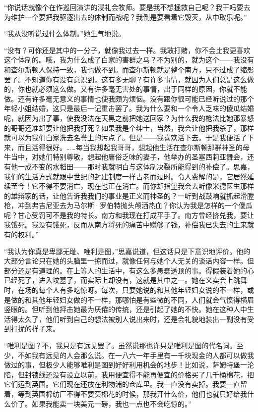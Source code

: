 \par “你说话就像个在作巡回演讲的浸礼会牧师。要是我不想拯救自己呢？我干吗要去为维护一个要把我驱逐出去的体制而战呢？我倒是要看着它毁灭，从中取乐呢。”
\par “我从没听说过什么体制。”她生气地说。
\par “没有？可你还是其中的一分子，就像我过去一样。我敢打赌，你不会比我更喜欢这个体制的。哦，我为什么成了白家的害群之马？不为别的，就为这个——我没有和查尔斯顿人保持一致，我也做不到。而查尔斯顿就是整个南方，只不过成了缩影罢了。不知道你有没有意识到，这有多无聊？有许多事情，就因为人们总是这么做的，你也就必须这么做。又有许多毫无害处的事情，出于同样的原因，你就不能做。还有许多毫无意义的事情也使我颇为烦恼。没有跟你很可能已经听说过的那个年轻小姐结婚，这只是最后一记重击罢了。我为什么要和一个令人乏味的傻瓜结婚呢，就因为出了事，使我没法在天黑之前把她送回家？为什么我的枪法比她那暴怒的哥哥还准却要让他把我打死？如果我是个绅士，当然，我会让他把我杀了，那样就可以为我们白家洗去名誉上的污点了。但是——我喜欢活下去。于是我便活了下来，而且活得很好。……每当我想起我哥哥，想起他生活在查尔斯顿那群神圣的母牛当中，对她们特别尊敬，想起他庸俗乏味的妻子，他举办的圣塞西莉亚舞会，还有他一成不变的水稻田——那时我就明白与这体制决裂所能得到的补偿了。思嘉，我们的生活方式就跟中世纪的封建制度一样古老而过时。令人费解的是，它居然延续至今！它不得不要消亡，现在也正在消亡。而你却指望我会去听像米德医生那样的雄辩家的话，让他告诉我我们的事业是正义而神圣的？一听到战鼓响就抓起滑膛枪，冲到弗吉尼亚去为马尔斯·罗伯特抛头颅洒热血？你认为我是怎样的一个傻瓜呢？甘心受罚可不是我的特长。南方和我现在打成平手了。南方曾经挤兑我，要让我饿死。我没有饿死，反而从南方将死的痛苦中赚够了钱，补偿我已失去的生来就有的权利。”
\par “我认为你真是卑鄙无耻、唯利是图，”思嘉说道，但这话只是下意识地评价。他的大部分言论只在她的头脑里一掠而过，就像任何与她个人无关的谈话内容一样。但部分还是有道理的。在上等人的生活中，有这么多愚蠢透顶的事。得假装着她的心已经死了，进入坟墓了，而实际上却没有，这就是其中之一。她在义卖会上跳舞时，在场的每个人有多吃惊呀。每次，只要她说的和其他年轻妇女说的不一样，或是做的和其他年轻妇女做的不一样，那哪怕是有些微的不同，人们就会气愤得横眉竖眼的。但听到他抨击她最为厌倦的传统，还是引起了她的不快。她在这种人中生活得太久了，他们听到自己的想法被别人说出来时，还是会礼貌地装出一副没有受到打扰的样子来。
\par “唯利是图？不，我只是有远见罢了。虽然说那也许只是唯利是图的代名词。至少，不如我有远见的人会那么说。在一八六一年手里有一千块现金的人都可以做我做过的事，但极少人能够唯利是图到好好利用机会的地步！比如说，萨姆特堡一沦陷，但封锁线还没有设立以前，我用便宜得不能再便宜的价格买了几千桶棉花，把它们运到英国。它们现在还放在利物浦的仓库里。我一直没有卖掉。我要一直留着，等到英国棉纺厂不得不要买棉花的时候，那我开什么价，他们也就只好给我什么价了。如果我能卖一块美元一磅，我也一点也不会吃惊的。”
